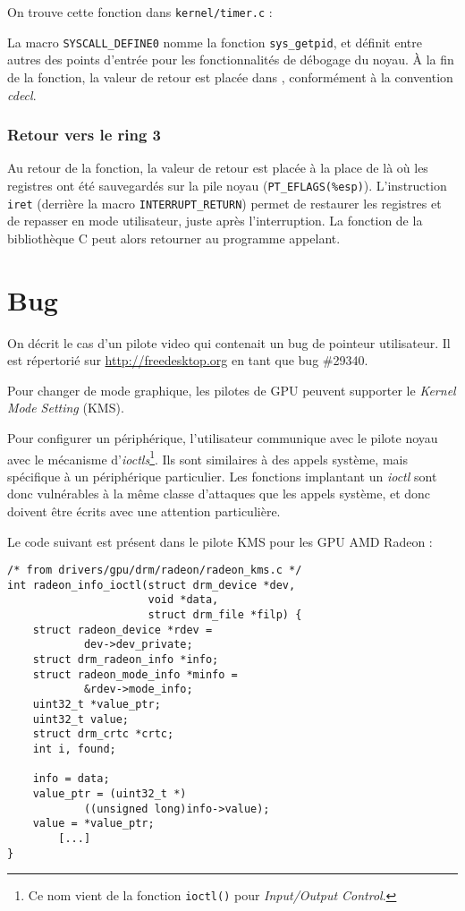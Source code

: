 On trouve cette fonction dans \texttt{kernel/timer.c} :


La macro \texttt{SYSCALL_DEFINE0} nomme la fonction \texttt{sys\_getpid}, et
définit entre autres des points d'entrée pour les fonctionnalités de débogage du
noyau. À la fin de la fonction, la valeur de retour est placée dans \eax,
conformément à la convention \emph{cdecl}.

\subsubsection{Retour vers le ring 3}

Au retour de la fonction, la valeur de retour est placée à la place de \eax là
où les registres ont été sauvegardés sur la pile noyau
(\texttt{PT\_EFLAGS(\%esp)}). L'instruction \texttt{iret} (derrière la macro
\texttt{INTERRUPT\_RETURN}) permet de restaurer les registres et de repasser en
mode utilisateur, juste après l'interruption. La fonction de la bibliothèque C
peut alors retourner au programme appelant.


\section{Bug}

On décrit le cas d'un pilote video qui contenait un bug de pointeur utilisateur.
Il est répertorié sur \url{http://freedesktop.org} en tant que bug \#29340. 

Pour changer de mode graphique, les pilotes de GPU peuvent supporter le
\emph{Kernel Mode Setting} (KMS).

Pour configurer un périphérique, l'utilisateur communique avec le pilote noyau
avec le mécanisme d'\emph{ioctls}\footnote{
  Ce nom vient de la fonction \texttt{ioctl()} pour
  \emph{Input/Output Control}.
}.
Ils sont similaires à des appels système, mais spécifique à un périphérique
particulier. Les fonctions implantant un \emph{ioctl} sont donc vulnérables à la
même classe d'attaques que les appels système, et donc doivent être écrits avec
une attention particulière.

Le code suivant est présent dans le pilote KMS pour les GPU AMD Radeon :

\begin{verbatim}
/* from drivers/gpu/drm/radeon/radeon_kms.c */
int radeon_info_ioctl(struct drm_device *dev,
                      void *data,
                      struct drm_file *filp) {
	struct radeon_device *rdev =
            dev->dev_private;
	struct drm_radeon_info *info;
	struct radeon_mode_info *minfo =
            &rdev->mode_info;
	uint32_t *value_ptr;
	uint32_t value;
	struct drm_crtc *crtc;
	int i, found;

	info = data;
	value_ptr = (uint32_t *)
            ((unsigned long)info->value);
	value = *value_ptr;
        [...]
}
\end{verbatim}

